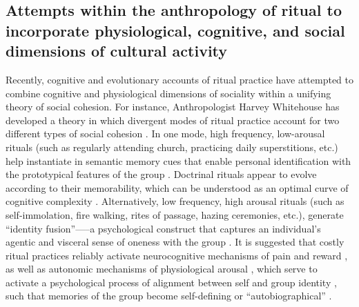 \begin{CJK}{UTF8}{gbsn}



\subsection{Attempts within the anthropology of ritual to incorporate physiological, cognitive, and social dimensions of cultural activity\label{sect:cogEvAnth}}

Recently, cognitive and evolutionary accounts of ritual practice have attempted to combine cognitive and physiological dimensions of sociality within a unifying theory of social cohesion.  For instance, Anthropologist Harvey Whitehouse has developed a theory in which divergent modes of ritual practice account for two different types of social cohesion \citep[commonly known as the ``modes theory''][]{Whitehouse1996,Whitehouse2004,Whitehouse2014}.  In one mode, high frequency, low-arousal rituals (such as regularly attending church, practicing daily superstitions, etc.) help instantiate in semantic memory cues that enable personal identification with the prototypical features of the group \cite[i.e., ``group identification,'' cf.][]{Turner1987}.  Doctrinal rituals appear to evolve according to their memorability, which can be understood as an optimal curve of cognitive complexity \citep[][]{Whitehouse2005,Kapitany2015}.  Alternatively, low frequency, high arousal rituals (such as self-immolation, fire walking, rites of passage, hazing ceremonies, etc.), generate ``identity fusion''—--a psychological construct that captures an individual’s agentic and visceral sense of oneness with the group \citep{Swann2009,Swann2015}.  It is suggested that costly ritual practices reliably activate neurocognitive mechanisms of pain and reward \citep{Fischer2014a}, as well as autonomic mechanisms of physiological arousal \citep{Swann2010,Jackson2018}, which serve to activate a psychological process of alignment between self and group identity \citep{Xygalatas2013}, such that memories of the group become self-defining or ``autobiographical'' \citep[see][]{Whitehouse2014}.


\end{CJK}
